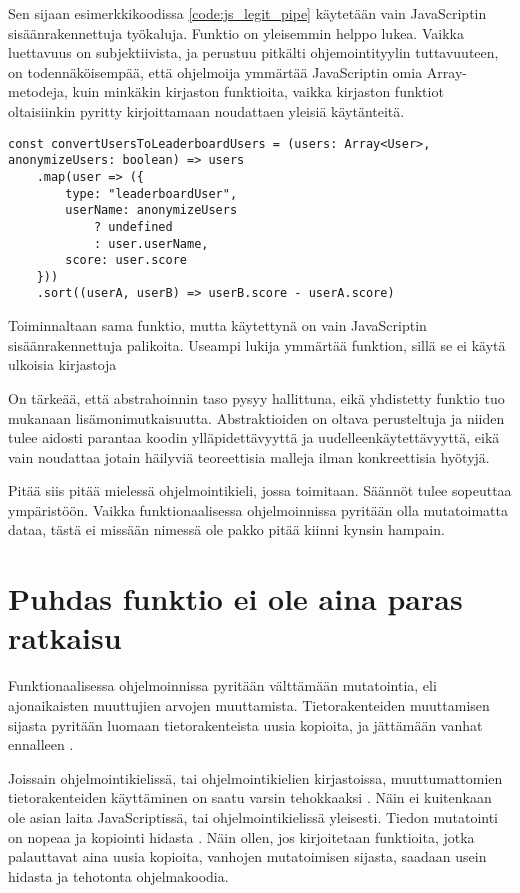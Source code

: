 Sen sijaan esimerkkikoodissa \ref{code:js_legit_pipe} käytetään vain JavaScriptin sisäänrakennettuja työkaluja. Funktio on yleisemmin helppo lukea. Vaikka luettavuus on subjektiivista, ja perustuu pitkälti ohjemointityylin tuttavuuteen, on todennäköisempää, että ohjelmoija ymmärtää JavaScriptin omia Array-metodeja, kuin minkäkin kirjaston funktioita, vaikka kirjaston funktiot oltaisiinkin pyritty kirjoittamaan noudattaen yleisiä käytänteitä.

\begin{code}
    \begin{verbatim}
const convertUsersToLeaderboardUsers = (users: Array<User>, anonymizeUsers: boolean) => users
    .map(user => ({
        type: "leaderboardUser",
        userName: anonymizeUsers 
            ? undefined 
            : user.userName,
        score: user.score
    }))
    .sort((userA, userB) => userB.score - userA.score)
    \end{verbatim}
    \caption{Toiminnaltaan sama funktio, mutta käytettynä on vain JavaScriptin sisäänrakennettuja palikoita. Useampi lukija ymmärtää funktion, sillä se ei käytä ulkoisia kirjastoja}
    \label{code:js_legit_pipe}
\end{code}


On tärkeää, että abstrahoinnin taso pysyy hallittuna, eikä yhdistetty funktio tuo mukanaan lisämonimutkaisuutta. Abstraktioiden on oltava perusteltuja ja niiden tulee aidosti parantaa koodin ylläpidettävyyttä ja uudelleenkäytettävyyttä, eikä vain noudattaa jotain häilyviä teoreettisia malleja ilman konkreettisia hyötyjä.


Pitää siis pitää mielessä ohjelmointikieli, jossa toimitaan. Säännöt tulee sopeuttaa ympäristöön. Vaikka funktionaalisessa ohjelmoinnissa pyritään olla mutatoimatta dataa, tästä ei missään nimessä ole pakko pitää kiinni kynsin hampain.

\section{Puhdas funktio ei ole aina paras ratkaisu}

Funktionaalisessa ohjelmoinnissa pyritään välttämään mutatointia, eli ajonaikaisten muuttujien arvojen muuttamista. Tietorakenteiden muuttamisen sijasta pyritään luomaan tietorakenteista uusia kopioita, ja jättämään vanhat ennalleen \cite{immutablejs_immutable,hickey_persistent_2009}.

Joissain ohjelmointikielissä, tai ohjelmointikielien kirjastoissa, muuttumattomien tietorakenteiden käyttäminen on saatu varsin tehokkaaksi \cite{hickey_persistent_2009,immutablejs_immutable}. Näin ei kuitenkaan ole asian laita JavaScriptissä, tai ohjelmointikielissä yleisesti. Tiedon mutatointi on nopeaa ja kopiointi hidasta \cite{turner_trauring_copying_2020}. Näin ollen, jos kirjoitetaan funktioita, jotka palauttavat aina uusia kopioita, vanhojen mutatoimisen sijasta, saadaan usein hidasta ja tehotonta ohjelmakoodia.

